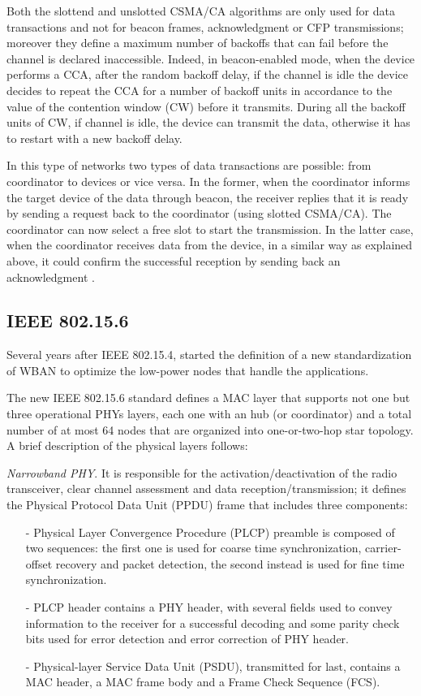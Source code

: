 \documentclass[conference]{IEEEtran}
\begin{document}
Both the slottend and unslotted CSMA/CA algorithms are only used for data transactions and not for beacon frames, acknowledgment or CFP transmissions; moreover they define a maximum number of backoffs that can fail before the channel is declared inaccessible. Indeed, in beacon-enabled mode, when the device performs a CCA, after the random backoff delay, if the channel is idle the device decides to repeat the CCA for a number of backoff units in accordance to the value of the contention window (CW) before it transmits. During all the backoff units of CW, if channel is idle, the device can transmit the data, otherwise it has to restart with a new backoff delay. 

In this type of networks two types of data transactions are possible: from coordinator to devices or vice versa. In the former, when the coordinator informs the target device of the data through beacon, the receiver replies that it is ready by sending a request back to the coordinator (using slotted CSMA/CA). The coordinator can now select a free slot to start the transmission. In the latter case, when the coordinator receives data from the device, in a similar way as explained above, it could confirm the successful reception by sending back an acknowledgment \cite{li2009performance}.


\subsection{IEEE 802.15.6}
Several years after IEEE 802.15.4, started the definition of a new standardization of WBAN to optimize the low-power nodes that handle the applications.

The new IEEE 802.15.6 standard defines a MAC layer that supports not one but three operational PHYs layers, each one with an hub (or coordinator) and a total number of at most 64 nodes that are organized into one-or-two-hop star topology. A brief description of the physical layers follows:
\newline

\textit{Narrowband PHY}. It is responsible for the activation/deactivation of the radio transceiver, clear channel assessment and data reception/transmission; it defines the Physical Protocol Data Unit (PPDU) frame that includes three components: 
\begin{itemize}
	\item[-] Physical Layer Convergence Procedure (PLCP) preamble is composed of two sequences: the first one is used for coarse time synchronization, carrier-offset recovery and packet detection, the second instead is used for fine time synchronization.
	\item[-] PLCP header contains a PHY header, with several fields used to convey information to the receiver for a successful decoding and some parity check bits used for error detection and error correction of PHY header.
	\item[-] Physical-layer Service Data Unit (PSDU), transmitted for last, contains a MAC header, a MAC frame body and a Frame Check Sequence (FCS).
\end{itemize}
\hfill
\end{document}
